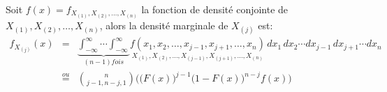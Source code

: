 \documentclass{article}
\newtheorem*{mydef}{Définition}
\newtheorem*{prop}{Propriété(s)}
\newtheorem*{remark}{Remarque}
\begin{document}
	\noindent Soit \(f(x)=f_{X_{(1)},X_{(2)},\ldots,X_{(n)}}\) la fonction de densité conjointe de \(X_{(1)},X_{(2)},\ldots,X_{(n)}\), alors la densité marginale de \(X_{(j)}\) est:
	\begin{eqnarray*}
		f_{X_{(j)}}(x)&=&\underbrace{\int_{-\infty}^{\infty}\cdots\int_{-\infty}^{\infty}}_{(n-1) fois} \underset{X_{(1)},X_{(2)},\ldots,X_{(j-1)},X_{(j+1)},\ldots,X_{(n)}}{f(x_1,x_2,\ldots,x_{j-1},x_{j+1},\ldots,x_n)}\,dx_1\,dx_2\cdots dx_{j-1}\,dx_{j+1}\cdots dx_n\\
		&\overset{ou}{=}&\binom{n}{j-1,n-j,1}\Big(\big(F(x)\big)^{j-1}\big(1-F(x)\big)^{n-j}f(x)\Big)
	\end{eqnarray*}
\end{document}
